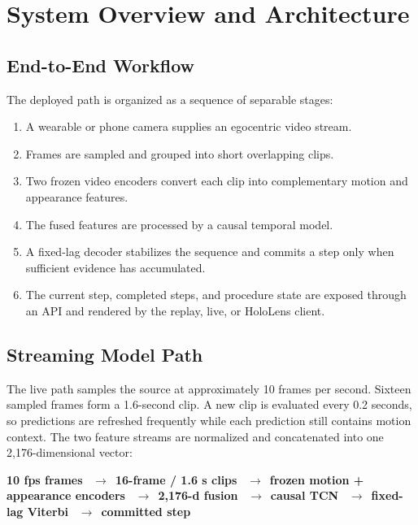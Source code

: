 \chapter{System Overview and Architecture}

\section{End-to-End Workflow}

The deployed path is organized as a sequence of separable stages:

\begin{enumerate}
    \item A wearable or phone camera supplies an egocentric video stream.
    \item Frames are sampled and grouped into short overlapping clips.
    \item Two frozen video encoders convert each clip into complementary
    motion and appearance features.
    \item The fused features are processed by a causal temporal model.
    \item A fixed-lag decoder stabilizes the sequence and commits a step only
    when sufficient evidence has accumulated.
    \item The current step, completed steps, and procedure state are exposed
    through an API and rendered by the replay, live, or HoloLens client.
\end{enumerate}

\section{Streaming Model Path}

The live path samples the source at approximately 10 frames per second. Sixteen
sampled frames form a 1.6-second clip. A new clip is evaluated every 0.2
seconds, so predictions are refreshed frequently while each prediction still
contains motion context. The two feature streams are normalized and
concatenated into one 2,176-dimensional vector:

\begin{center}
\begin{tcolorbox}[colback=darkBlue!5!white,colframe=darkBlue,width=0.94\textwidth]
\centering
\textbf{10 fps frames}
\ $\rightarrow$\ 
\textbf{16-frame / 1.6 s clips}
\ $\rightarrow$\ 
\textbf{frozen motion + appearance encoders}
\ $\rightarrow$\ 
\textbf{2,176-d fusion}
\ $\rightarrow$\ 
\textbf{causal TCN}
\ $\rightarrow$\ 
\textbf{fixed-lag Viterbi}
\ $\rightarrow$\ 
\textbf{committed step}
\end{tcolorbox}
\end{center}


